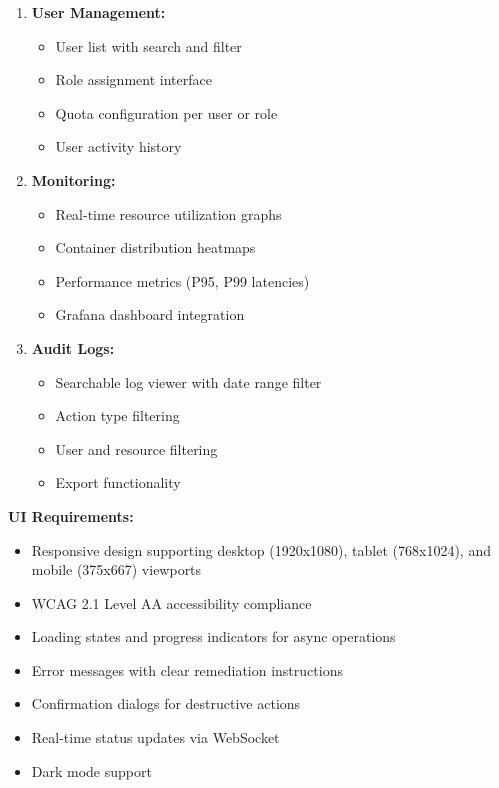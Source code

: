 \documentclass[12pt,a4paper]{article}
\begin{document}
\begin{enumerate}
    \item \textbf{User Management:}
    \begin{itemize}
        \item User list with search and filter
        \item Role assignment interface
        \item Quota configuration per user or role
        \item User activity history
    \end{itemize}
    
    \item \textbf{Monitoring:}
    \begin{itemize}
        \item Real-time resource utilization graphs
        \item Container distribution heatmaps
        \item Performance metrics (P95, P99 latencies)
        \item Grafana dashboard integration
    \end{itemize}
    
    \item \textbf{Audit Logs:}
    \begin{itemize}
        \item Searchable log viewer with date range filter
        \item Action type filtering
        \item User and resource filtering
        \item Export functionality
    \end{itemize}
\end{enumerate}
\textbf{UI Requirements:}

\begin{itemize}
    \item Responsive design supporting desktop (1920x1080), tablet (768x1024), and mobile (375x667) viewports
    \item WCAG 2.1 Level AA accessibility compliance
    \item Loading states and progress indicators for async operations
    \item Error messages with clear remediation instructions
    \item Confirmation dialogs for destructive actions
    \item Real-time status updates via WebSocket
    \item Dark mode support
\end{itemize}
\end{document}
